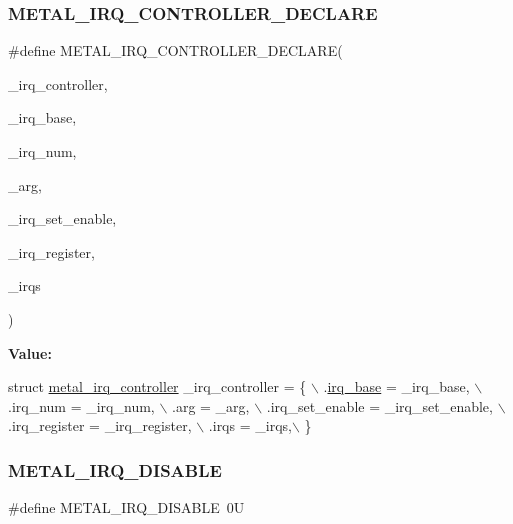 \subsubsection{\texorpdfstring{M\+E\+T\+A\+L\+\_\+\+I\+R\+Q\+\_\+\+C\+O\+N\+T\+R\+O\+L\+L\+E\+R\+\_\+\+D\+E\+C\+L\+A\+RE}{METAL\_IRQ\_CONTROLLER\_DECLARE}}
{\footnotesize\ttfamily \#define M\+E\+T\+A\+L\+\_\+\+I\+R\+Q\+\_\+\+C\+O\+N\+T\+R\+O\+L\+L\+E\+R\+\_\+\+D\+E\+C\+L\+A\+RE(\begin{DoxyParamCaption}\item[{}]{\+\_\+irq\+\_\+controller,  }\item[{}]{\+\_\+irq\+\_\+base,  }\item[{}]{\+\_\+irq\+\_\+num,  }\item[{}]{\+\_\+arg,  }\item[{}]{\+\_\+irq\+\_\+set\+\_\+enable,  }\item[{}]{\+\_\+irq\+\_\+register,  }\item[{}]{\+\_\+irqs }\end{DoxyParamCaption})}

{\bfseries Value\+:}
\begin{DoxyCode}
\textcolor{keyword}{struct }\hyperlink{structmetal__irq__controller}{metal\_irq\_controller} \_irq\_controller = \{ \(\backslash\)
                .\hyperlink{structmetal__irq__controller_af0e813505179ca61b4c26d2017ebb05f}{irq\_base} = \_irq\_base, \(\backslash\)
                .irq\_num = \_irq\_num, \(\backslash\)
                .arg = \_arg, \(\backslash\)
                .irq\_set\_enable = \_irq\_set\_enable, \(\backslash\)
                .irq\_register = \_irq\_register, \(\backslash\)
                .irqs = \_irqs,\(\backslash\)
        \}
\end{DoxyCode}
\mbox{\label{group__irq_ga1cc45f7942dbbca274f2d7822b7d7df0}} 
\subsubsection{\texorpdfstring{M\+E\+T\+A\+L\+\_\+\+I\+R\+Q\+\_\+\+D\+I\+S\+A\+B\+LE}{METAL\_IRQ\_DISABLE}}
{\footnotesize\ttfamily \#define M\+E\+T\+A\+L\+\_\+\+I\+R\+Q\+\_\+\+D\+I\+S\+A\+B\+LE~0U}


